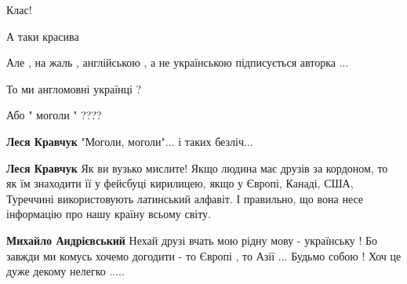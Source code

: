\begin{itemize}
 
Клас!

 
А таки красива

 

Але , на жаль , англійською , а не українською підписується авторка ...

То ми англомовні українці ?

Або " моголи " ????

\begin{itemize}
 
\textbf{Леся Кравчук} "Моголи, моголи"... і таких безліч...

 
\textbf{Леся Кравчук} Як ви вузько мислите! Якщо людина має друзів за кордоном, то як їм знаходити її у фейсбуці кирилицею, якщо у Європі, Канаді, США, Туреччині використовують латинський алфавіт. І правильно, що вона несе інформацію про нашу країну всьому світу.

\begin{itemize}
 

\textbf{Михайло Андрієвський} Нехай друзі вчать мою рідну мову - українську ! Бо завжди ми комусь хочемо догодити - то Європі , то Азії ...
Будьмо собою ! Хоч це дуже декому нелегко .....


\end{itemize}
\end{itemize}
\end{itemize}
